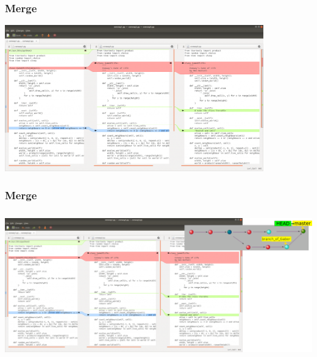 \documentclass[aspectratio=169]{beamer}
\begin{document}
\begin{frame}
	\frametitle<presentation>{Merge}
	
	\includegraphics[height=180pt]{pictures/git-merge-meld.png}
		
\end{frame}

\begin{frame}
	\frametitle<presentation>{Merge}
	
	\includegraphics[height=180pt]{pictures/git-merge-meld-2.png}
		
\end{frame}
\end{document}
